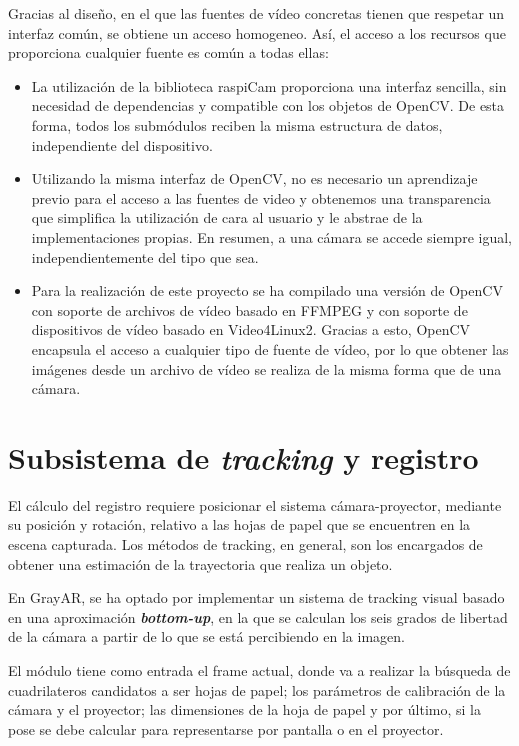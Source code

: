 Gracias al diseño, en el que las fuentes de vídeo concretas tienen que respetar un interfaz común, se obtiene un acceso homogeneo. Así, el acceso a los recursos que proporciona cualquier fuente es común a todas ellas:
\begin{itemize}
\item La utilización de la biblioteca raspiCam proporciona una interfaz sencilla, sin necesidad de dependencias y compatible con los objetos de OpenCV. De esta forma, todos los submódulos reciben la misma estructura de datos, independiente del dispositivo.

\item Utilizando la misma interfaz de OpenCV, no es necesario un aprendizaje previo para el acceso a las fuentes de video y obtenemos una transparencia que simplifica la utilización de cara al usuario y le abstrae de la implementaciones propias. En resumen, a una cámara se accede siempre igual, independientemente del tipo que sea.

\item Para la realización de este proyecto se ha compilado una versión de OpenCV con soporte de archivos de vídeo basado en FFMPEG y con soporte de dispositivos de vídeo basado en Video4Linux2. Gracias a esto, OpenCV encapsula el acceso a cualquier tipo de fuente de vídeo, por lo que obtener las imágenes desde un archivo de vídeo se realiza de la misma forma que de una cámara.
\end{itemize}

\section{Subsistema de \textit{tracking} y registro}
El cálculo del registro requiere posicionar el sistema cámara-proyector, mediante su posición y rotación, relativo a las hojas de papel que se encuentren en la escena capturada. Los métodos de tracking, en general, son los encargados de obtener una estimación de la trayectoria que realiza un
objeto. 

En GrayAR, se ha optado por implementar un sistema de tracking visual basado en una aproximación \textbf{\textit{bottom-up}}\cite{Marimon}, en la que se calculan los seis grados de libertad de la cámara a partir de lo que se está percibiendo en la imagen.

El módulo tiene como entrada el frame actual, donde va a realizar la búsqueda de cuadrilateros candidatos a ser hojas de papel; los parámetros de calibración de la cámara y el proyector; las dimensiones de la hoja de papel y por último, si la pose se debe calcular para representarse por pantalla o en el proyector.

